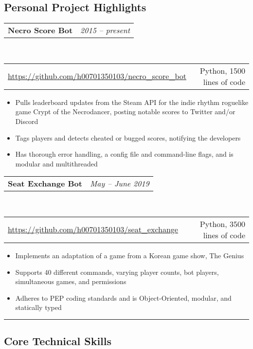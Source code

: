 \documentclass[10pt,letterpaper]{article}
\makeatletter
\newcommand{\headerrow}[2]
{\begin{tabular*}{\linewidth}{l@{\extracolsep{\fill}}r}
	#1 &
	#2 \\
\end{tabular*}}
\makeatother
\begin{document}
\subsection*{Personal Project Highlights}


\headerrow
    {\textbf{Necro Score Bot}}
    {\emph{2015 -- present}}
\\
\headerrow
    {\url{https://github.com/h00701350103/necro\_score\_bot}}
    {Python, 1500 lines of code}
\begin{itemize}[noitemsep, topsep=0pt]
    \item Pulls leaderboard updates from the Steam API for the indie rhythm
        roguelike game Crypt of the Necrodancer, posting notable scores to
        Twitter and/or Discord
    \item Tags players and detects cheated or bugged scores, notifying the
        developers
    \item Has thorough error handling, a config file and command-line
        flags, and is modular and multithreaded
\end{itemize}

\vspace{0.5em}
\headerrow
    {\textbf{Seat Exchange Bot}}
    {\emph{May -- June 2019}}
\\
\headerrow
    {\url{https://github.com/h00701350103/seat\_exchange}}
    {Python, 3500 lines of code}
\begin{itemize}[noitemsep, topsep=0pt]
    \item Implements an adaptation of a game from a Korean game show, The
        Genius
    \item Supports 40 different commands, varying player counts,
        bot players, simultaneous games, and permissions
    \item Adheres to PEP coding standards and is Object-Oriented, modular,
        and statically typed
\end{itemize}



\vspace{0.5em}
\hrule
\vspace{-0.4em}
\subsection*{Core Technical Skills}
\end{document}
